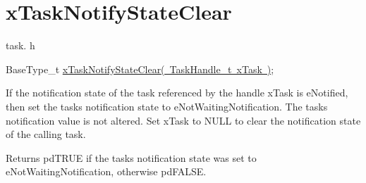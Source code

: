 \hypertarget{group__x_task_notify_state_clear}{}\section{x\+Task\+Notify\+State\+Clear}
\label{group__x_task_notify_state_clear}
task. h 
\begin{DoxyPre}BaseType\_t \mbox{\hyperlink{task_8h_a4cb6c908a9d2d733e9d519d7dc27bb34}{xTaskNotifyStateClear( TaskHandle\_t xTask )}};\end{DoxyPre}


If the notification state of the task referenced by the handle x\+Task is e\+Notified, then set the task\textquotesingle{}s notification state to e\+Not\+Waiting\+Notification. The task\textquotesingle{}s notification value is not altered. Set x\+Task to N\+U\+LL to clear the notification state of the calling task.

\begin{DoxyReturn}{Returns}
pd\+T\+R\+UE if the task\textquotesingle{}s notification state was set to e\+Not\+Waiting\+Notification, otherwise pd\+F\+A\+L\+SE. 
\end{DoxyReturn}
